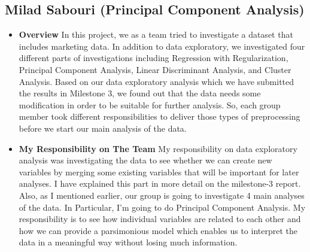 \documentclass[11pt]{article} %
\begin{document}
\subsection{Milad Sabouri (Principal Component Analysis)}
\begin{itemize}
\item \textbf{Overview}
\newline
In this project, we as a team tried to investigate a dataset that includes marketing data. In addition to data exploratory, we investigated four different parts of investigations including Regression with Regularization, Principal Component Analysis, Linear Discriminant Analysis, and Cluster Analysis. Based on our data exploratory analysis which we have submitted the results in Milestone 3, we found out that the data needs some modification in order to be suitable for further analysis. So, each group member took different responsibilities to deliver those types of preprocessing before we start our main analysis of the data.

\item \textbf{My Responsibility on The Team}
\newline
My responsibility on data exploratory analysis was investigating the data to see whether we can create new variables by merging some existing variables that will be important for later analyses. I have explained this part in more detail on the milestone-3 report. Also, as I mentioned earlier, our group is going to investigate 4 main analyses of the data. In Particular, I’m going to do Principal Component Analysis. My responsibility is to see how individual variables are related to each other and how we can provide a parsimonious model which enables us to interpret the data in a meaningful way without losing much information.


\end{itemize}
\end{document}

